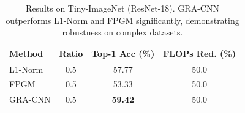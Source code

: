 \begin{table}[ht]
\centering
\caption{Results on Tiny-ImageNet (ResNet-18). GRA-CNN outperforms L1-Norm and FPGM significantly, demonstrating robustness on complex datasets.}
\label{tab:tiny_results}
\begin{tabular}{lccc}
\toprule
Method & Ratio & Top-1 Acc (\%) & FLOPs Red. (\%) \\
\midrule
L1-Norm & 0.5 & 57.77 & 50.0 \\
FPGM    & 0.5 & 53.33 & 50.0 \\
GRA-CNN & 0.5 & \textbf{59.42} & 50.0 \\
\bottomrule
\end{tabular}
\end{table}